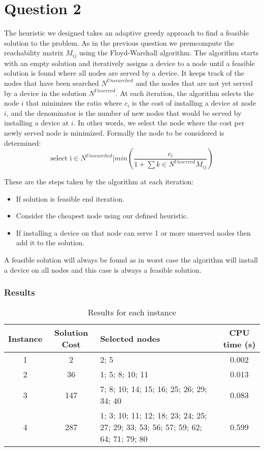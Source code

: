 \section{Question 2}

The heuristic we designed takes an adaptive greedy approach to find a feasible solution to the problem.
As in the previous question we premcompute the reachability matrix $M_{ij}$ using the Floyd-Warshall algorithm.
The algorithm starts with an empty solution and iteratively assigns a device to a node until a feasible solution is found where all nodes are served by a device.
It keeps track of the nodes that have been searched $N^{Unsearched}$ and the nodes that are not yet served by a device in the solution $N^{Unserved}$.
At each iteration, the algorithm selects the node $i$ that minimizes the ratio
where $c_i$ is the cost of installing a device at node $i$, and the denominator is the number of new nodes that would be served by installing a device at $i$. In other words, we select the node where the cost per newly served node is minimized.
Formally the node to be considered is determined: 
$$\text{select i} \in N^{Unsearched} | min(\frac{c_i}{1 + \sum{k \in N^{Unserved}}^{} M_{ij}})$$

These are the steps taken by the algorithm at each iteration:
\begin{itemize}
	\item If solution is feasible end iteration.
	\item Consider the cheapest node using our defined heuristic.
	\item If installing a device on that node can serve 1 or more unserved nodes then add it to the solution.
\end{itemize}

A feasible solution will always be found as in worst case the algorithm will install a device on all nodes and this case is always a feasible solution.

\subsubsection*{Results}

\begin{table}[h!]
	\centering
	\begin{tabularx}{\textwidth}{|c|c|X|c|}
		\hline
		\textbf{Instance} & \textbf{Solution Cost} & \textbf{Selected nodes} & \textbf{CPU time (s)} \\
		\hline
		1 & 2 & 2; 5 & 0.002 \\
		\hline
		2 & 36 & 1; 5; 8; 10; 11 & 0.013 \\
		\hline
		3 & 147 & 7; 8; 10; 14; 15; 16; 25; 26; 29; 34; 40 & 0.083 \\
		\hline
		4 & 287 & 1; 3; 10; 11; 12; 18; 23; 24; 25; 27; 29; 33; 53; 56; 57; 59; 62; 64; 71; 79; 80 & 0.599 \\
		\hline
	\end{tabularx}
	\caption{Results for each instance}
	\label{tab:instance_costs}
\end{table}
